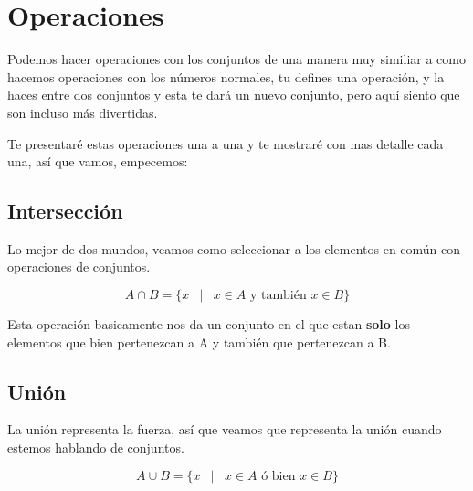 \documentclass[12pt]{report}                                    %
\DeclareMathOperator \Space {\quad}                             %
\DeclareMathOperator \MiniSpace {\;}                            %
\newcommand \Such {\MiniSpace|\MiniSpace}                       %
\begin{document}
        \clearpage
        \section{Operaciones}

            Podemos hacer operaciones con los conjuntos de una manera muy similiar a como hacemos
            operaciones con los números normales, tu defines una operación, y la haces entre dos conjuntos
            y esta te dará un nuevo conjunto,  pero aquí siento que son incluso más divertidas.

            Te presentaré estas operaciones una a una y te mostraré con mas detalle cada una, así 
            que vamos, empecemos:

            \subsection{Intersección}

                Lo mejor de dos mundos, veamos como seleccionar a los elementos en común con operaciones
                de conjuntos.

                \begin{equation}
                    A \cap B = \{ x \Such x \in A \text{ y también } x \in B \}
                \end{equation}

                Esta operación basicamente nos da un conjunto en el que estan \textbf{solo} los elementos
                que bien pertenezcan a A y también que pertenezcan a B.


            \clearpage
            \subsection{Unión}

                La unión representa la fuerza, así que veamos que representa la unión cuando estemos
                hablando de conjuntos.

                \begin{equation}
                    A \cup B = \{ x \Such x \in A \text{ ó bien } x \in B \}
                \end{equation}
\end{document}
